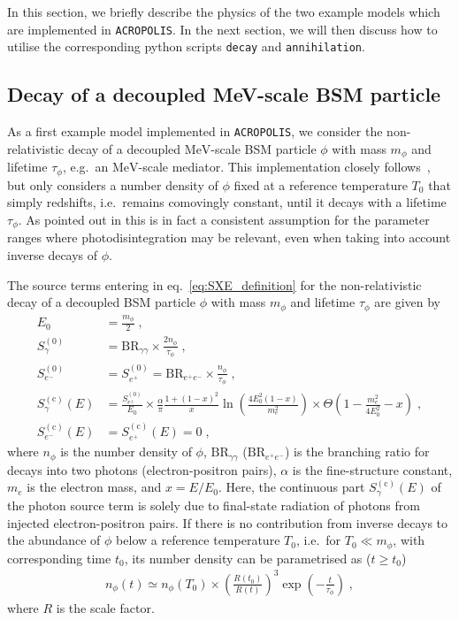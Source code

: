 \documentclass[11pt,a4paper]{article}
\newcommand{\eqsp}{\;}
\begin{document}
In this section, we briefly describe the physics of the two example models which are implemented in \texttt{ACROPOLIS}. In the next section, we will then discuss how to utilise the corresponding python scripts
\texttt{decay} and \texttt{annihilation}.

\subsection{Decay of a decoupled MeV-scale BSM particle}
\label{sec:decay_model}
As a first example model implemented in \texttt{ACROPOLIS}, we consider the non-relativistic decay of a decoupled $\mathrm{MeV}$-scale BSM particle $\phi$ with mass $m_\phi$ and lifetime $\tau_\phi$, e.g.\ an $\mathrm{MeV}$-scale mediator. This implementation closely follows~\cite{Hufnagel:2018bjp,Depta:2020zbh}, but only considers a number density of $\phi$ fixed at a reference temperature $T_0$ that simply redshifts, i.e.\ remains comovingly constant, until it decays with a lifetime $\tau_\phi$. As pointed out in \cite{Depta:2020zbh} this is in fact a consistent assumption for the parameter ranges where photodisintegration may be relevant, even when taking into account inverse decays of $\phi$.

The source terms entering in eq.~\eqref{eq:SXE_definition} for the non-relativistic decay of a decoupled BSM particle $\phi$ with mass $m_\phi$ and lifetime $\tau_\phi$ are given by~\cite{Hufnagel:2018bjp,Forestell:2018txr,Mardon:2009rc,Birkedal:2005ep}
\begin{align}
E_0 &= \frac{m_\phi}{2}\eqsp, \\
S_\gamma^{(0)} &= \text{BR}_{\gamma \gamma} \times \frac{2 n_\phi}{\tau_\phi}\eqsp,\label{eq:sa_decay} \\
S_{e^-}^{(0)} &= S_{e^+}^{(0)} = \text{BR}_{e^+ e^-} \times \frac{n_\phi}{\tau_\phi}\eqsp,\label{eq:se_decay} \\
S_\gamma^{(\text{c})} (E) &= \frac{S^{(0)}_{e^\pm}}{E_0} \times \frac{\alpha}{\pi} \frac{1 + (1-x)^2}{x} \ln \left( \frac{4 E_0^2 (1-x)}{m_e^2} \right) \times \Theta \left( 1 - \frac{m_e^2}{4 E_0^2} - x \right)\eqsp, \label{eq:safsr_decay}\\
S_{e^-}^{(\text{c})} (E) &= S_{e^+}^{(\text{c})} (E) = 0\eqsp,
\end{align}
where $n_\phi$ is the number density of $\phi$, $\text{BR}_{\gamma \gamma}$ ($\text{BR}_{e^+ e^-}$) is the branching ratio for decays into two photons (electron-positron pairs), $\alpha$ is the fine-structure constant, $m_e$ is the electron mass, and $x = E/E_0$. Here, the continuous part $S_\gamma^{(\text{c})} (E)$ of the photon source term is solely due to final-state radiation of photons from injected electron-positron pairs.  If there is no contribution from inverse decays to the abundance of $\phi$ below a reference temperature $T_0$, i.e.\ for $T_0 \ll m_\phi$, with corresponding time $t_0$, its number density can be parametrised as ($t \geq t_0$)
\begin{align}
n_\phi (t) \simeq n_\phi (T_0) \times \left( \frac{R(t_0)}{R(t)} \right)^3 \exp \left( - \frac{t}{\tau_\phi} \right)\eqsp,
\label{eq:n_decay}
\end{align}
where $R$ is the scale factor.
\end{document}
